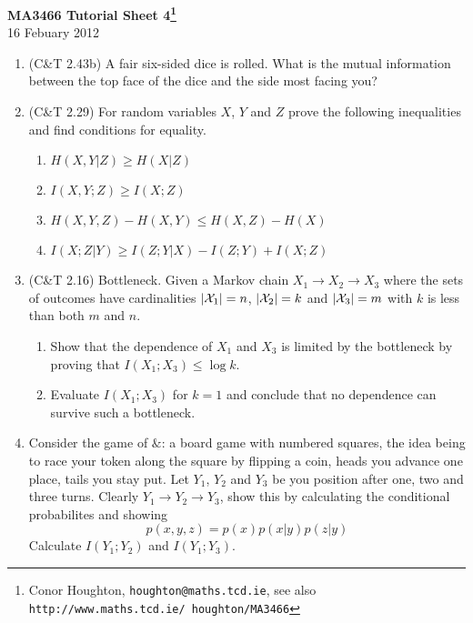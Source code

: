 \documentclass[12pt]{article}
\begin{document}
\begin{center}
{\bf MA3466 Tutorial Sheet 4\footnote{Conor Houghton, {\tt houghton@maths.tcd.ie}, see also {\tt http://www.maths.tcd.ie/ houghton/MA3466}}}\\[1cm]{} 16 Febuary 2012
\end{center}
\begin{enumerate}

\item (C\&T 2.43b) A fair six-sided dice is rolled. What is the mutual information between the top face of the dice and the side most facing you?

\item (C\&T 2.29) For random variables $X$, $Y$ and $Z$ prove the following inequalities and find conditions for equality.
\begin{enumerate}
\item $H(X,Y|Z)\ge H(X|Z)$
\item $I(X,Y;Z)\ge I(X;Z)$
\item $H(X,Y,Z)-H(X,Y)\le H(X,Z)-H(X)$
\item $I(X;Z|Y)\ge I(Z;Y|X)-I(Z;Y)+I(X;Z)$
\end{enumerate}

\item (C\&T 2.16) Bottleneck. Given a Markov chain $X_1\rightarrow X_2\rightarrow X_3$ where the sets of outcomes have cardinalities $|{\cal X}_1|=n$, $|{\cal X}_2|=k$ and $|{\cal X}_3|=m$ with $k$ is less than both $m$ and $n$. 
\begin{enumerate}
\item Show that the dependence of $X_1$ and $X_3$ is limited by the bottleneck by proving that $I(X_1;X_3)\le \log{k}$.
\item Evaluate $I(X_1;X_3)$ for $k=1$ and conclude that no dependence can survive such a bottleneck.
\end{enumerate}

\item Consider the game of $\&$\texttrademark: a board game with numbered squares, the idea being to race your token along the square by flipping a coin, heads you advance one place, tails you stay put. Let $Y_1$, $Y_2$ and $Y_3$ be you position after one, two and three turns. Clearly $Y_1\rightarrow Y_2 \rightarrow Y_3$, show this by calculating the conditional probabilites and showing
\begin{equation}
p(x,y,z)=p(x)p(x|y)p(z|y)
\end{equation}
Calculate $I(Y_1;Y_2)$ and $I(Y_1;Y_3)$.


\end{enumerate}
\end{document}

